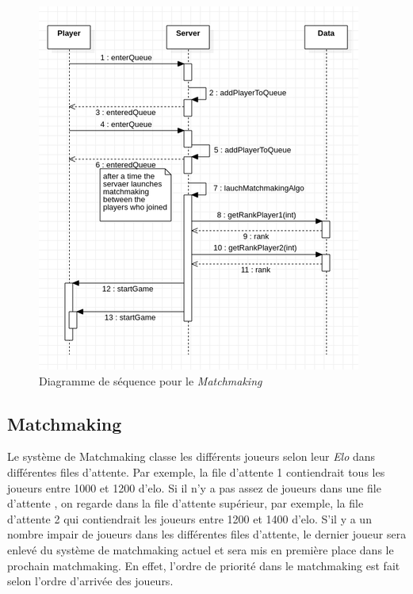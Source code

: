 \documentclass[10pt, a4paper]{article}
\begin{document}
\begin{figure}[H]
\centering
\includegraphics[scale=0.72]{SequenceMatchmaking.png}
\caption{Diagramme de séquence pour le \textit{Matchmaking}}
\label{SD_matchmaker} %
\end{figure}

\subsection{Matchmaking}
Le système de Matchmaking classe les différents joueurs selon leur \textit{Elo} dans différentes files d'attente. Par exemple, la file d'attente 1 contiendrait tous les joueurs entre 1000 et 1200 d'elo. Si il n'y a pas assez de joueurs dans une file d'attente , on regarde dans la file d'attente supérieur, par exemple, la file d'attente 2 qui contiendrait les joueurs entre 1200 et 1400 d'elo. S'il y a un nombre impair de joueurs dans les différentes files d'attente, le dernier joueur sera enlevé du système de matchmaking actuel et sera mis en première place dans le prochain matchmaking. En effet, l'ordre de priorité dans le matchmaking est fait selon l'ordre d'arrivée des joueurs.
\end{document}
